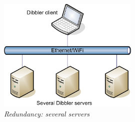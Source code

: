 \begin{itemize}
\begin{figure}[ht]
\begin{center}
\includegraphics[width=0.6\textwidth]{dibbler-multiple-srv}
\caption{\emph{Redundancy: several servers}}
\end{center}
\end{figure}


\end{itemize}
